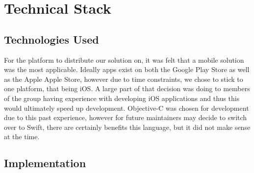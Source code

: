 \section{Technical Stack}
\subsection{Technologies Used}
For the platform to distribute our solution on, it was felt that a mobile solution was the most applicable. Ideally apps exist on both the Google Play Store as well as the Apple Apple Store, however due to time constraints, we chose to stick to one platform, that being iOS. A large part of that decision was doing to members of the group having experience with developing iOS applications and thus this would ultimately speed up development. Objective-C was chosen for development due to this past experience, however for future maintainers may decide to switch over to Swift, there are certainly benefits this language, but it did not make sense at the time.
\subsection{Implementation}
